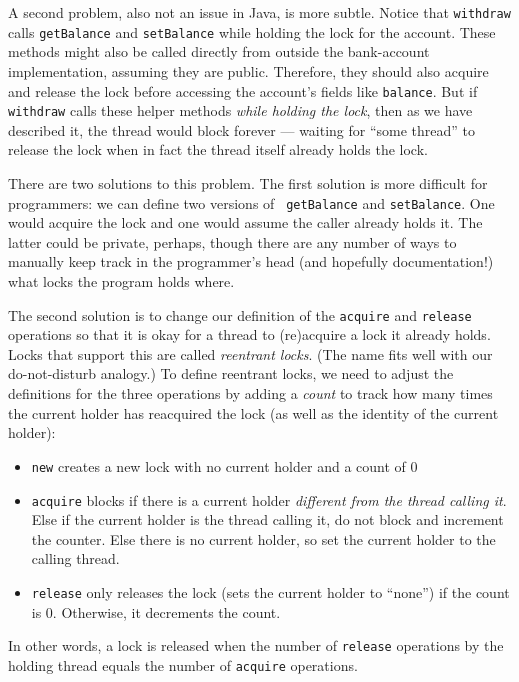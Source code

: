 \documentclass[10pt]{article}
\begin{document}
A second problem, also not an issue in Java, is more subtle.  Notice
that {\tt withdraw} calls {\tt getBalance} and {\tt setBalance} while
holding the lock for the account.  These methods might also be called
directly from outside the bank-account implementation, assuming they
are public.  Therefore, they should also acquire and release the lock
before accessing the account's fields like {\tt balance}.  But if {\tt
  withdraw} calls these helper methods \emph{while holding the lock},
then as we have described it, the thread would block forever ---
waiting for ``some thread'' to release the lock when in fact the
thread itself already holds the lock.

There are two solutions to this problem.  The first solution is more
difficult for programmers: we can define two versions of {\tt
  getBalance} and {\tt setBalance}.  One would acquire the lock and
one would assume the caller already holds it.  The latter could be
private, perhaps, though there are any number of ways to manually keep
track in the programmer's head (and hopefully documentation!) what
locks the program holds where.  

The second solution is to change our definition of the {\tt acquire}
and {\tt release} operations so that it is okay for a thread to
(re)acquire a lock it already holds.  Locks that support this are
called \emph{reentrant locks}.  (The name fits well with our
do-not-disturb analogy.) To define reentrant locks, we need to adjust
the definitions for the three operations by adding a \emph{count} to
track how many times the current holder has reacquired the lock (as
well as the identity of the current holder):
\begin{itemize}
\item {\tt new} creates a new lock with no current holder and a count
  of 0
\item {\tt acquire} blocks if there is a current holder
  \emph{different from the thread calling it}.  Else if the current holder
  is the thread calling it, do not block and increment the counter.
  Else there is no current holder, so set the current holder to the
  calling thread.
\item {\tt release} only releases the lock (sets the current holder to
  ``none'') if the count is 0.  Otherwise, it decrements the count.
\end{itemize}
In other words, a lock is released when the number of {\tt release}
operations by the holding thread equals the number of {\tt acquire}
operations.
\end{document}
